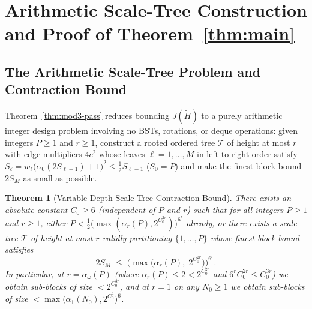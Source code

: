 \documentclass[11pt]{article}
\newtheorem{theorem}{Theorem}[section]
\theoremstyle{definition}
\theoremstyle{remark}
\begin{document}
\section{Arithmetic Scale-Tree Construction and Proof of Theorem~\ref{thm:main}}
\label{sec:contraction}

\subsection{The Arithmetic Scale-Tree Problem and Contraction Bound}
\label{subsec:overview-mod4}

Theorem~\ref{thm:mod3-pass} reduces bounding $J(\widetilde{H})$ to a purely arithmetic integer design problem involving no BSTs, rotations, or deque operations: given integers $P \ge 1$ and $r \ge 1$, construct a rooted ordered tree $\mathcal{T}$ of height at most $r$ with edge multipliers $4 c^2$ whose leaves $\ell = 1, \dots, M$ in left-to-right order satisfy $S_\ell = w_\ell\big(\alpha_0(2 S_{\ell-1}) + 1\big)^2 \le \frac{1}{2} S_{\ell-1}$ ($S_0 = P$) and make the finest block bound $2 S_M$ as small as possible.

\begin{theorem}[Variable-Depth Scale-Tree Contraction Bound]
\label{thm:mod4-contraction}
There exists an absolute constant $C_0 \ge 6$ (independent of $P$ and $r$) such that for all integers $P \ge 1$ and $r \ge 1$, either $P < \frac{1}{2}\big(\max(\alpha_r(P), 2^{C_0^{2r}})\big)^{6^r}$ already, or there exists a scale tree $\mathcal{T}$ of height at most $r$ validly partitioning $\{1, \dots, P\}$ whose finest block bound satisfies
\[
2 S_M \;\le\; \Big(\max\big(\alpha_r(P),\; 2^{C_0^{2r}}\big)\Big)^{6^r}.
\]
In particular, at $r = \alpha_\omega(P)$ (where $\alpha_r(P) \le 2 < 2^{C_0^{2r}}$ and $6^r C_0^{2r} \le C_0^{3r}$) we obtain sub-blocks of size $< 2^{C_0^{3r}}$, and at $r = 1$ on any $N_0 \ge 1$ we obtain sub-blocks of size $< \max\big(\alpha_1(N_0), 2^{C_0^2}\big)^6$.
\end{theorem}
\end{document}
